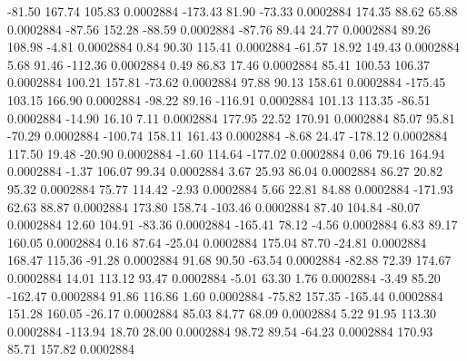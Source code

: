      -81.50      167.74      105.83     0.0002884
     -173.43       81.90      -73.33     0.0002884
      174.35       88.62       65.88     0.0002884
      -87.56      152.28      -88.59     0.0002884
      -87.76       89.44       24.77     0.0002884
       89.26      108.98       -4.81     0.0002884
        0.84       90.30      115.41     0.0002884
      -61.57       18.92      149.43     0.0002884
        5.68       91.46     -112.36     0.0002884
        0.49       86.83       17.46     0.0002884
       85.41      100.53      106.37     0.0002884
      100.21      157.81      -73.62     0.0002884
       97.88       90.13      158.61     0.0002884
     -175.45      103.15      166.90     0.0002884
      -98.22       89.16     -116.91     0.0002884
      101.13      113.35      -86.51     0.0002884
      -14.90       16.10        7.11     0.0002884
      177.95       22.52      170.91     0.0002884
       85.07       95.81      -70.29     0.0002884
     -100.74      158.11      161.43     0.0002884
       -8.68       24.47     -178.12     0.0002884
      117.50       19.48      -20.90     0.0002884
       -1.60      114.64     -177.02     0.0002884
        0.06       79.16      164.94     0.0002884
       -1.37      106.07       99.34     0.0002884
        3.67       25.93       86.04     0.0002884
       86.27       20.82       95.32     0.0002884
       75.77      114.42       -2.93     0.0002884
        5.66       22.81       84.88     0.0002884
     -171.93       62.63       88.87     0.0002884
      173.80      158.74     -103.46     0.0002884
       87.40      104.84      -80.07     0.0002884
       12.60      104.91      -83.36     0.0002884
     -165.41       78.12       -4.56     0.0002884
        6.83       89.17      160.05     0.0002884
        0.16       87.64      -25.04     0.0002884
      175.04       87.70      -24.81     0.0002884
      168.47      115.36      -91.28     0.0002884
       91.68       90.50      -63.54     0.0002884
      -82.88       72.39      174.67     0.0002884
       14.01      113.12       93.47     0.0002884
       -5.01       63.30        1.76     0.0002884
       -3.49       85.20     -162.47     0.0002884
       91.86      116.86        1.60     0.0002884
      -75.82      157.35     -165.44     0.0002884
      151.28      160.05      -26.17     0.0002884
       85.03       84.77       68.09     0.0002884
        5.22       91.95      113.30     0.0002884
     -113.94       18.70       28.00     0.0002884
       98.72       89.54      -64.23     0.0002884
      170.93       85.71      157.82     0.0002884
